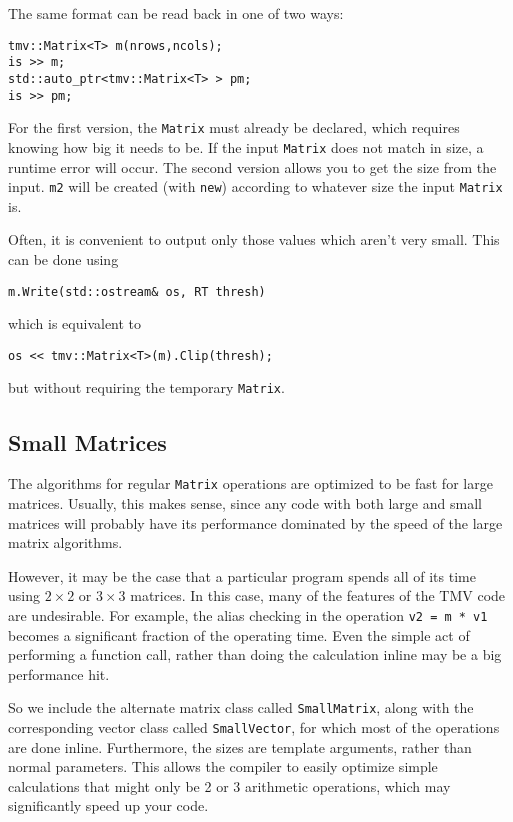 \documentclass[twoside,letterpaper,11pt]{article}
\renewcommand{\tt}[1]{{\texttt {#1}}}
\begin{document}
The same format can be read back in one of two ways:
\begin{verbatim}
tmv::Matrix<T> m(nrows,ncols);
is >> m;
std::auto_ptr<tmv::Matrix<T> > pm;
is >> pm;
\end{verbatim}
For the first version, the \tt{Matrix} must already be declared, which 
requires knowing how big it needs to be.  If the input \tt{Matrix} does not
match in size, a runtime error will occur.
The second version allows you to get the size from the input.  \tt{m2}
will be created (with \tt{new}) 
according to whatever size the input \tt{Matrix} is.

Often, it is convenient to output only those values which aren't very small. 
This can be done using
\begin{verbatim}
m.Write(std::ostream& os, RT thresh)
\end{verbatim}
which is equivalent to
\begin{verbatim}
os << tmv::Matrix<T>(m).Clip(thresh);
\end{verbatim}
but without requiring the temporary \tt{Matrix}.

\subsection{Small Matrices}

The algorithms for regular \tt{Matrix} operations are optimized to be
fast for large matrices.  Usually, this makes sense, since any code with
both large and small matrices will probably have its performance dominated
by the speed of the large matrix algorithms.

However, it may be the case that a particular program spends all of its
time using $2 \times 2$ or $3 \times 3$ matrices.  In this case, 
many of the features of the TMV code are undesirable.  For example, 
the alias checking in the operation \tt{v2 = m * v1} becomes a significant
fraction of the operating time.  Even the simple act of performing a function
call, rather than doing the calculation inline may be a big performance hit.

So we include the alternate matrix class called \tt{SmallMatrix}, along 
with the corresponding vector class called \tt{SmallVector}, for which most of 
the operations are done inline.  Furthermore, the sizes are template arguments,
rather than normal parameters.  This allows the compiler to easily optimize
simple calculations that might only be 2 or 3 arithmetic operations, which
may significantly speed up your code.
\end{document}
